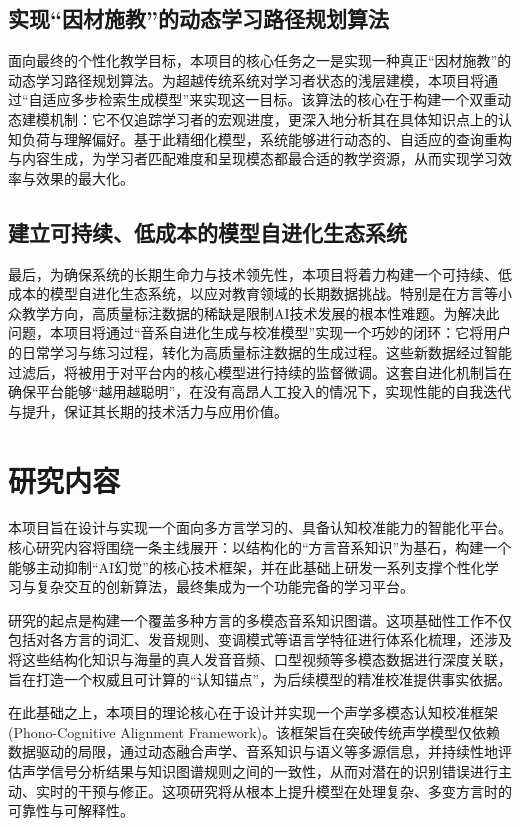 \subsection{实现“因材施教”的动态学习路径规划算法}
面向最终的个性化教学目标，本项目的核心任务之一是实现一种真正“因材施教”的动态学习路径规划算法。为超越传统系统对学习者状态的浅层建模，本项目将通过“自适应多步检索生成模型”来实现这一目标。该算法的核心在于构建一个双重动态建模机制：它不仅追踪学习者的宏观进度，更深入地分析其在具体知识点上的认知负荷与理解偏好。基于此精细化模型，系统能够进行动态的、自适应的查询重构与内容生成，为学习者匹配难度和呈现模态都最合适的教学资源，从而实现学习效率与效果的最大化。

\subsection{建立可持续、低成本的模型自进化生态系统}
最后，为确保系统的长期生命力与技术领先性，本项目将着力构建一个可持续、低成本的模型自进化生态系统，以应对教育领域的长期数据挑战。特别是在方言等小众教学方向，高质量标注数据的稀缺是限制AI技术发展的根本性难题。为解决此问题，本项目将通过“音系自进化生成与校准模型”实现一个巧妙的闭环：它将用户的日常学习与练习过程，转化为高质量标注数据的生成过程。这些新数据经过智能过滤后，将被用于对平台内的核心模型进行持续的监督微调。这套自进化机制旨在确保平台能够“越用越聪明”，在没有高昂人工投入的情况下，实现性能的自我迭代与提升，保证其长期的技术活力与应用价值。

\section{研究内容}
本项目旨在设计与实现一个面向多方言学习的、具备认知校准能力的智能化平台。核心研究内容将围绕一条主线展开：以结构化的“方言音系知识”为基石，构建一个能够主动抑制“AI幻觉”的核心技术框架，并在此基础上研发一系列支撑个性化学习与复杂交互的创新算法，最终集成为一个功能完备的学习平台。

研究的起点是构建一个覆盖多种方言的多模态音系知识图谱。这项基础性工作不仅包括对各方言的词汇、发音规则、变调模式等语言学特征进行体系化梳理，还涉及将这些结构化知识与海量的真人发音音频、口型视频等多模态数据进行深度关联，旨在打造一个权威且可计算的“认知锚点”，为后续模型的精准校准提供事实依据。

在此基础之上，本项目的理论核心在于设计并实现一个声学多模态认知校准框架 (Phono-Cognitive Alignment Framework)。该框架旨在突破传统声学模型仅依赖数据驱动的局限，通过动态融合声学、音系知识与语义等多源信息，并持续性地评估声学信号分析结果与知识图谱规则之间的一致性，从而对潜在的识别错误进行主动、实时的干预与修正。这项研究将从根本上提升模型在处理复杂、多变方言时的可靠性与可解释性。

